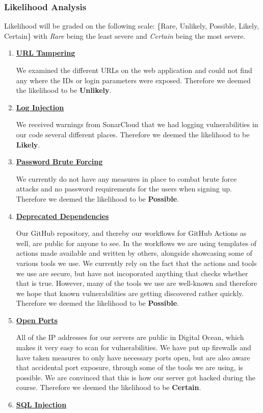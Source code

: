 \subsubsection{Likelihood Analysis}
Likelihood will be graded on the following scale: \{Rare, Unlikely, Possible, Likely, Certain\} with \textit{Rare} being the least severe and \textit{Certain} being the most severe.
\begin{enumerate}
    \item \textbf{\underline{URL Tampering}}

    We examined the different URLs on the web application and could not find any where the IDs or login parameters were exposed. Therefore we deemed the likelihood to be \textbf{Unlikely}.
    \item \textbf{\underline{Log Injection}}

    We received warnings from SonarCloud that we had logging vulnerabilities in our code several different places. Therefore we deemed the likelihood to be \textbf{Likely}.

    \item \textbf{\underline{Password Brute Forcing}}

    We currently do not have any measures in place to combat brute force attacks and no password requirements for the users when signing up. Therefore we deemed the likelihood to be \textbf{Possible}.
    \item \textbf{\underline{Deprecated Dependencies}}

    Our GitHub repository, and thereby our workflows for GitHub Actions as well, are public for anyone to see. In the workflows we are using templates of actions made available and written by others, alongside showcasing some of various tools we use. We currently rely on the fact that the actions and tools we use are secure, but have not incoporated anything that checks whether that is true. However, many of the tools we use are well-known and therefore we hope that known vulnerabilities are getting discovered rather quickly. Therefore we deemed the likelihood to be \textbf{Possible}.
    \item \textbf{\underline{Open Ports}}

    All of the IP addresses for our servers are public in Digital Ocean, which makes it very easy to scan for vulnerabilities. We have put up firewalls and have taken measures to only have necessary ports open, but are also aware that accidental port exposure, through some of the tools we are using, is possible. We are convinced that this is how our server got hacked during the course. Therefore we deemed the likelihood to be \textbf{Certain}.
    \item \textbf{\underline{SQL Injection}}


\end{enumerate}
